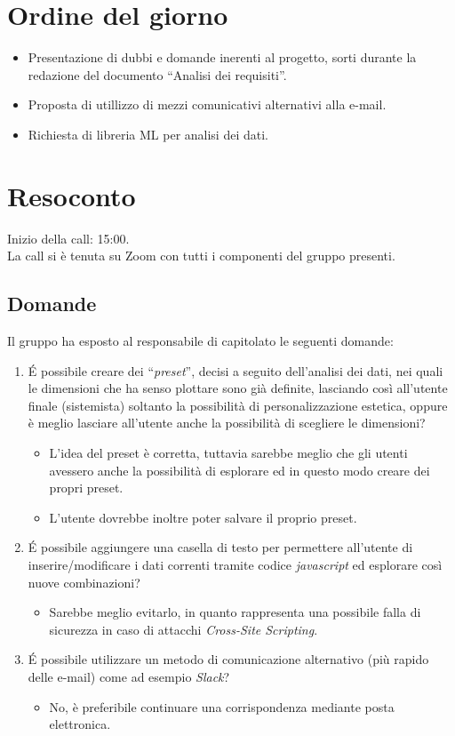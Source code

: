 \section{Ordine del giorno}

\begin{itemize}
	\item Presentazione di dubbi e domande inerenti al progetto, sorti durante la redazione del documento ``Analisi dei requisiti''.
	\item Proposta di utillizzo di mezzi comunicativi alternativi alla e-mail.
	\item Richiesta di libreria ML per analisi dei dati.
\end{itemize}

\section{Resoconto}

\noindent 
Inizio della call: 15:00. \\
\noindent La call si è tenuta su Zoom con tutti i componenti del gruppo presenti.
\subsection{Domande}
Il gruppo ha esposto al responsabile di capitolato le seguenti domande:
\begin{enumerate}
	\item \' E possibile creare dei ``\textit{preset}'', decisi a seguito dell'analisi dei dati, nei quali le dimensioni che ha senso plottare sono già definite, lasciando così all'utente finale (sistemista) soltanto la possibilità di personalizzazione estetica, oppure è meglio lasciare all'utente anche la possibilità di scegliere le dimensioni?
	\begin{itemize}
		\item L'idea del preset è corretta, tuttavia sarebbe meglio che gli utenti avessero anche la possibilità di esplorare ed in questo modo creare dei propri preset.
		\item L'utente dovrebbe inoltre poter salvare il proprio preset.
	\end{itemize}
	\item \' E possibile aggiungere una casella di testo per permettere all'utente di inserire/modificare i dati correnti tramite codice \textit{javascript} ed esplorare così nuove combinazioni?
	\begin{itemize}
		\item Sarebbe meglio evitarlo, in quanto rappresenta una possibile falla di sicurezza in caso di attacchi \textit{Cross-Site Scripting}.
	\end{itemize}
	\item \'E possibile utilizzare un metodo di comunicazione alternativo (più rapido delle e-mail) come ad esempio \textit{Slack}?
	\begin{itemize}
		\item No, è preferibile continuare una corrispondenza mediante posta elettronica.
	\end{itemize}
	
\end{enumerate}

